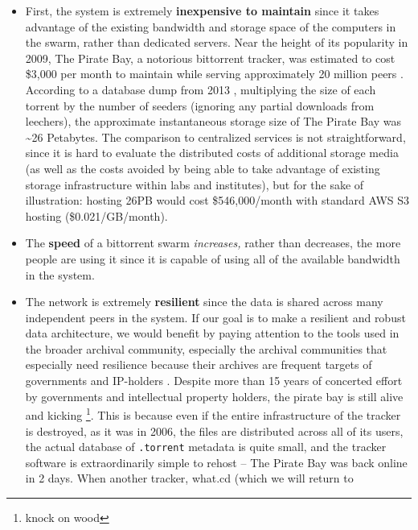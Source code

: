 \documentclass[notoc]{tufte-book}
\begin{document}
\begin{itemize}

\item
  First, the system is extremely \textbf{inexpensive to maintain} since
  it takes advantage of the existing bandwidth and storage space of the
  computers in the swarm, rather than dedicated servers. Near the height
  of its popularity in 2009, The Pirate Bay, a notorious bittorrent
  tracker, was estimated to cost \$3,000 per month to maintain while
  serving approximately 20 million peers \citep{roettgersPirateBayDistributing2009} . According to a database dump
  from 2013 \citep{PirateBayArchiveteam2020} , multiplying the
  size of each torrent by the number of seeders (ignoring any partial
  downloads from leechers), the approximate instantaneous storage size
  of The Pirate Bay was \textasciitilde26 Petabytes. The comparison to
  centralized services is not straightforward, since it is hard to
  evaluate the distributed costs of additional storage media (as well as
  the costs avoided by being able to take advantage of existing storage
  infrastructure within labs and institutes), but for the sake of
  illustration: hosting 26PB would cost \$546,000/month with standard
  AWS S3 hosting (\$0.021/GB/month).
\item
  The \textbf{speed} of a bittorrent swarm \emph{increases,} rather than
  decreases, the more people are using it since it is capable of using
  all of the available bandwidth in the system.
\item
  The network is extremely \textbf{resilient} since the data is shared
  across many independent peers in the system. If our goal is to make a
  resilient and robust data architecture, we would benefit by paying
  attention to the tools used in the broader archival community,
  especially the archival communities that especially need resilience
  because their archives are frequent targets of governments and
  IP-holders\citep{spiesDataIntegrityLibrarians2017} . Despite
  more than 15 years of concerted effort by governments and intellectual
  property holders, the pirate bay is still alive and kicking \citep{kim15YearsPirate2019} \footnote{knock on wood}. This is because
  even if the entire infrastructure of the tracker is destroyed, as it
  was in 2006, the files are distributed across all of its users, the
  actual database of \texttt{.torrent} metadata is quite small, and the
  tracker software is extraordinarily simple to rehost \citep{vandersarOpenBayNow2014}  -- The Pirate Bay was back online in 2
  days. When another tracker, what.cd (which we will return to

\end{itemize}
\end{document}

